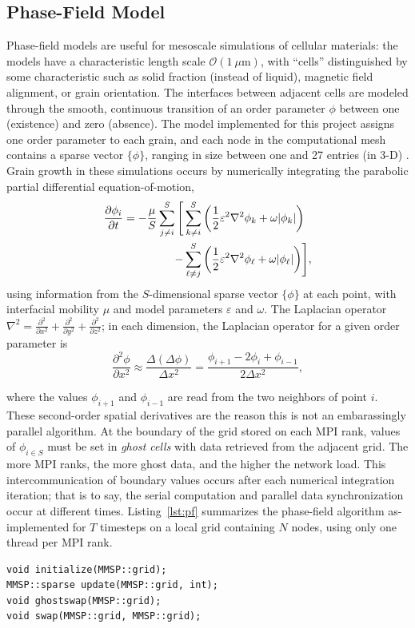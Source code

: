 \documentclass[11pt]{article}
\begin{document}
\begin{multicols*}{2}
\subsection*{Phase-Field Model}
Phase-field models are useful for mesoscale simulations of cellular materials:
the models have a characteristic length scale $\mathcal{O}(1\ \mu\mathrm{m})$, with ``cells'' distinguished by some characteristic such as solid fraction (instead of liquid), magnetic field alignment, or grain orientation.
The interfaces between adjacent cells are modeled through the smooth, continuous transition of an order parameter $\phi$ between one (existence) and zero (absence).
The model implemented for this project assigns one order parameter to each grain, and each node in the computational mesh contains a sparse vector $\{\phi\}$, ranging in size between one and 27 entries (in 3-D) \cite{Steinbach1999}.
Grain growth in these simulations occurs by numerically integrating the parabolic partial differential equation-of-motion,
\begin{align}
\frac{\partial\phi_i}{\partial t} = -\frac{\mu}{S}\sum\limits_{j\neq i}^S\Bigg[
  &\sum\limits_{k\neq i}^S\bigg(\frac{1}{2}\varepsilon^2\nabla^2\phi_k+\omega|\phi_k|\bigg)\notag\\
  -&\sum\limits_{\ell\neq j}^S\bigg(\frac{1}{2}\varepsilon^2\nabla^2\phi_\ell+\omega|\phi_\ell|\bigg)\Bigg],\label{eqn:pf}
\end{align}
using information from the $S$-dimensional sparse vector $\{\phi\}$ at each point, with interfacial mobility $\mu$ and model parameters $\varepsilon$ and $\omega$.
The Laplacian operator $\nabla^2 = \frac{\partial^2}{\partial x^2} + \frac{\partial^2}{\partial y^2} + \frac{\partial^2}{\partial z^2}$;
in each dimension, the Laplacian operator for a given order parameter is
\begin{equation}
\frac{\partial^2\phi}{\partial x^2} \approx \frac{\Delta(\Delta\phi)}{\Delta x^2} = \frac{\phi_{i+1} - 2\phi_i + \phi_{i-1}}{2\Delta x^2},\label{eqn:laplacian}
\end{equation}

where the values $\phi_{i+1}$ and $\phi_{i-1}$ are read from the two neighbors of point $i$. 
These second-order spatial derivatives are the reason this is not an embarassingly parallel algorithm.
At the boundary of the grid stored on each MPI rank, values of $\phi_{i \in S}$ must be set in \emph{ghost cells} with data retrieved from the adjacent grid.
The more MPI ranks, the more ghost data, and the higher the network load.
This intercommunication of boundary values occurs after each numerical integration iteration; that is to say, the serial computation and parallel data synchronization occur at different times.
Listing~\ref{lst:pf} summarizes the phase-field algorithm as-implemented for $T$ timesteps on a local grid containing $N$ nodes, using only one thread per MPI rank.
\begin{minipage}{0.475\textwidth}
\begin{center}
\begin{lstlisting}
void initialize(MMSP::grid);
MMSP::sparse update(MMSP::grid, int);
void ghostswap(MMSP::grid);
void swap(MMSP::grid, MMSP::grid);


\end{lstlisting}
\end{center}
\end{minipage}
\end{multicols*}
\end{document}
